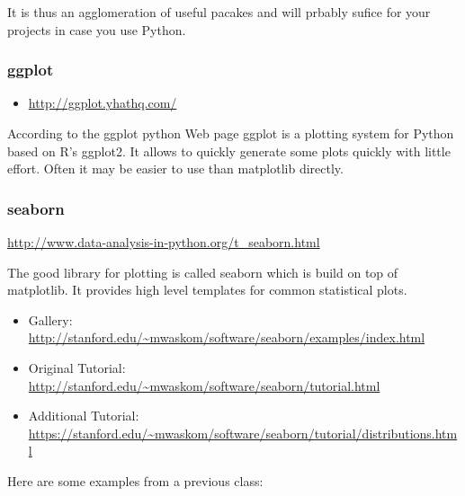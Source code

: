 It is thus an agglomeration of useful pacakes and will prbably sufice
for your projects in case you use Python.

\subsubsection{ggplot}\label{ggplot}

\begin{itemize}
\tightlist
\item
  \url{http://ggplot.yhathq.com/}
\end{itemize}

According to the ggplot python Web page ggplot is a plotting system for
Python based on R's ggplot2. It allows to quickly generate some plots
quickly with little effort. Often it may be easier to use than
matplotlib directly.

\subsubsection{seaborn}\label{seaborn}

\url{http://www.data-analysis-in-python.org/t_seaborn.html}

The good library for plotting is called seaborn which is build on top of
matplotlib. It provides high level templates for common statistical
plots.

\begin{itemize}
\tightlist
\item
  Gallery:
  \url{http://stanford.edu/~mwaskom/software/seaborn/examples/index.html}
\item
  Original Tutorial:
  \url{http://stanford.edu/~mwaskom/software/seaborn/tutorial.html}
\item
  Additional Tutorial:
  \url{https://stanford.edu/~mwaskom/software/seaborn/tutorial/distributions.html}
\end{itemize}

Here are some examples from a previous class:


